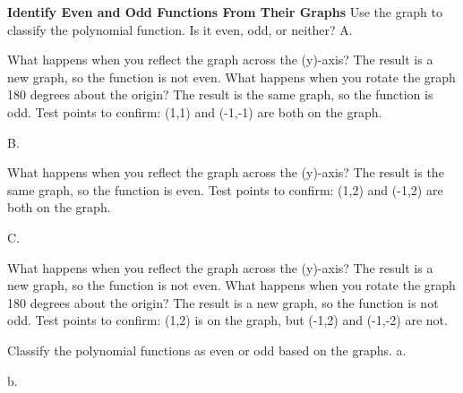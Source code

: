 \documentclass{article}
\newenvironment{example}[1]{}{}         %
\newenvironment{tryit}[1]{}{}           %
\newcommand{\answer}[1]{}               %
\newcommand{\placeholder}[2]{}          %
\newcommand{\te}[1]{}                   %
\begin{document}
\begin{example}{1}
\textbf{Identify Even and Odd Functions From Their Graphs}
Use the graph to classify the polynomial function. Is it even, odd, or neither?
A.
\placeholder{graph}{Red cubic y=x cubed through solid O,(1,1),(-1,-1), arrowheads lower left and upper right; blue dashed rotation arc about origin from (1,1) to (-1,-1). x -2 to2,y -2.5 to2.5, half-unit grid, x labels -1,1,y -2,-1,1,2.}
What happens when you reflect the graph across the (y)-axis?
The result is a new graph, so the function is not even.
What happens when you rotate the graph 180 degrees about the origin?
The result is the same graph, so the function is odd.
Test points to confirm: (1,1) and (-1,-1) are both on the graph.
\answer{This function is odd.}
B.
\placeholder{graph}{Red upward quartic with minimum (0,1), solid points (-1,2),(1,2), blue dashed horizontal double arrow at y2. x window -2 to2,y -1 to3, half-unit grid; x labels -1,1,O,y2; ends point up.}
What happens when you reflect the graph across the (y)-axis?
The result is the same graph, so the function is even.
Test points to confirm: (1,2) and (-1,2) are both on the graph.
\answer{This function is even.}
C.
\placeholder{graph}{Red increasing cubic with inflection (0,1), marked (1,2), crossing x-axis at -1. Window x -2 to2,y -2 to3, half-unit grid; x labels1,O,y -1,2. Arrowheads lower left and upper right.}
What happens when you reflect the graph across the (y)-axis?
The result is a new graph, so the function is not even.
What happens when you rotate the graph 180 degrees about the origin?
The result is a new graph, so the function is not odd.
Test points to confirm: (1,2) is on the graph, but (-1,2) and (-1,-2) are not.
\answer{This function is neither even nor odd.}
\te{COMMON ERROR An odd degree polynomial function may have rotational symmetry around a point other than (0,0). It is only an odd function if the symmetry is around the origin.}
\end{example}
\begin{tryit}{1}
Classify the polynomial functions as even or odd based on the graphs.
a.
\placeholder{graph}{Red decreasing cubic through O, resembling y=-x cubed, ends upper left/lower right. x,y window -5 to5, unit grid labeled -4,-2,2,4, axes x,y with arrows.}
b.
\placeholder{graph}{Red downward parabola vertex (0,-2), symmetric about y-axis, ends down. x,y window -5 to5, unit grid labeled -4,-2,2,4, O at origin, axes x,y with arrows.}
\answer{a. odd; b. even}
\end{tryit}
\end{document}
